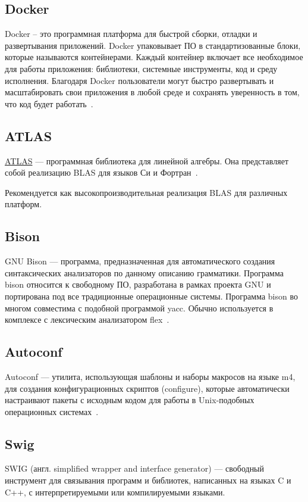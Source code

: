 \subsection{Docker}
Docker – это программная платформа для быстрой сборки, отладки и развертывания
приложений. Docker упаковывает ПО в стандартизованные блоки, которые называются
контейнерами. Каждый контейнер включает все необходимое для работы приложения:
библиотеки, системные инструменты, код и среду исполнения. Благодаря Docker
пользователи могут быстро развертывать и масштабировать свои приложения в любой
среде и сохранять уверенность в том, что код будет работать~\cite{docker}.

\subsection{ATLAS}
\hyperlink{atlas}{ATLAS} — программная библиотека для линейной алгебры. Она
представляет собой реализацию BLAS для языков Си и Фортран~\cite{atlas}.

Рекомендуется как высокопроизводительная реализация BLAS для различных платформ.

\subsection{Bison}
GNU Bison — программа, предназначенная для автоматического создания
синтаксических анализаторов по данному описанию грамматики. Программа bison
относится к свободному ПО, разработана в рамках проекта GNU и портирована под
все традиционные операционные системы. Программа bison во многом совместима с
подобной программой yacc. Обычно используется в комплексе с лексическим
анализатором flex~\cite{bison}.

\subsection{Autoconf}
Autoconf — утилита, использующая шаблоны и наборы макросов на языке m4, для
создания конфигурационных скриптов (configure), которые автоматически настраивают
пакеты с исходным кодом для работы в Unix-подобных операционных системах~\cite{autoconf}.

\subsection{Swig}
SWIG (англ. simplified wrapper and interface generator) — свободный инструмент
для связывания программ и библиотек, написанных на языках C и C++, с
интерпретируемыми или компилируемыми языками.

